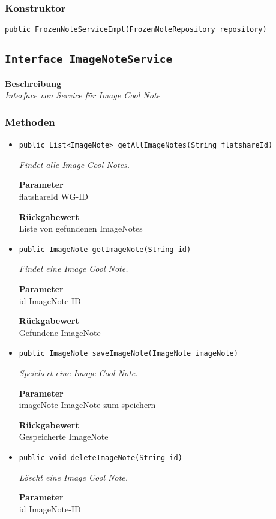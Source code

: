     \subsubsection{Konstruktor}
    \texttt{public FrozenNoteServiceImpl(FrozenNoteRepository repository)}
    \subsection{\texttt{Interface ImageNoteService}}
    \textbf{Beschreibung} \\
    \textit{Interface von Service für Image Cool Note}
    \subsubsection{Methoden}
    \begin{itemize}
    	\item{\texttt{public List<ImageNote> getAllImageNotes(String flatshareId)}}
    	
    	\textit{Findet alle Image Cool Notes.}
    	
    	\textbf{Parameter} \\
    	flatshareId WG-ID
    	
    	\textbf{Rückgabewert} \\
    	Liste von gefundenen ImageNotes        \item{\texttt{public ImageNote getImageNote(String id)}}
    	
    	\textit{Findet eine Image Cool Note.}
    	
    	\textbf{Parameter} \\
    	id ImageNote-ID
    	
    	\textbf{Rückgabewert} \\
    	Gefundene ImageNote        \item{\texttt{public ImageNote saveImageNote(ImageNote imageNote)}}
    	
    	\textit{Speichert eine Image Cool Note.}
    	
    	\textbf{Parameter} \\
    	imageNote ImageNote zum speichern
    	
    	\textbf{Rückgabewert} \\
    	Gespeicherte ImageNote        \item{\texttt{public void deleteImageNote(String id)}}
    	
    	\textit{Löscht eine Image Cool Note.}
    	
    	\textbf{Parameter} \\
    	id ImageNote-ID
    	
    	
    \end{itemize}
